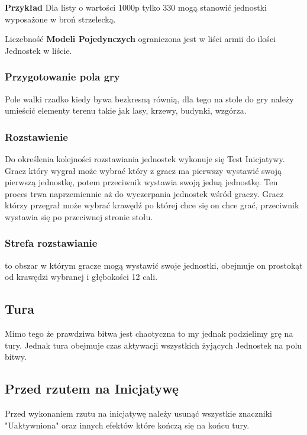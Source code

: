 \textbf{Przykład} Dla listy o wartości 1000p tylko 330 mogą stanowić jednostki wyposażone w broń strzelecką.   

Liczebność \textbf{Modeli Pojedynczych} ograniczona jest w liści armii do ilości Jednostek w liście. 

\subsubsection{Przygotowanie pola gry}

Pole walki rzadko kiedy bywa bezkresną równią, dla tego na stole do gry należy umieścić elementy terenu takie jak lasy, krzewy, budynki, wzgórza. 

\subsubsection{Rozstawienie}

Do określenia kolejności rozstawiania jednostek wykonuje się Test Inicjatywy. Gracz który wygrał może wybrać który z gracz ma pierwszy wystawić swoją pierwszą jednostkę, potem przeciwnik wystawia swoją jedną jednostkę. Ten proces trwa naprzemiennie aż do wyczerpania jednostek wśród graczy. Gracz którzy przegrał może wybrać krawędź po której chce się on chce grać, przeciwnik wystawia się po przeciwnej stronie stołu. 

\subsubsection{Strefa rozstawianie} to obszar w którym gracze mogą wystawić swoje jednostki, obejmuje on prostokąt od krawędzi wybranej i głębokości 12 cali. 



\subsection{Tura}

Mimo tego że prawdziwa bitwa jest chaotyczna to my jednak podzielimy grę na tury. Jednak tura obejmuje czas aktywacji wszystkich żyjących Jednostek na polu bitwy. 

\subsection{Przed rzutem na Inicjatywę}
Przed wykonaniem rzutu na inicjatywę należy usunąć wszystkie znaczniki "Uaktywniona" oraz innych efektów które kończą się na końcu tury. 

